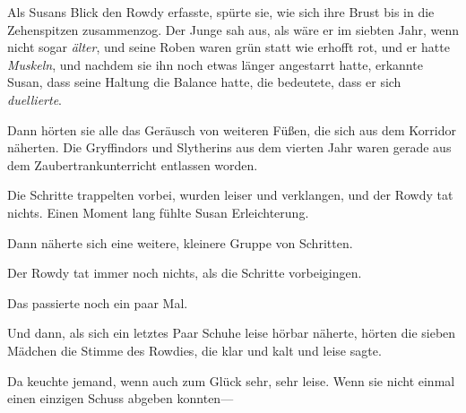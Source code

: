 Als Susans Blick den Rowdy erfasste, spürte sie, wie sich ihre Brust bis in die Zehenspitzen zusammenzog. Der Junge sah aus, als wäre er im siebten Jahr, wenn nicht sogar \emph{älter}, und seine Roben waren grün statt wie erhofft rot, und er hatte \emph{Muskeln}, und nachdem sie ihn noch etwas länger angestarrt hatte, erkannte Susan, dass seine Haltung die Balance hatte, die bedeutete, dass er sich \emph{duellierte}.

Dann hörten sie alle das Geräusch von weiteren Füßen, die sich aus dem Korridor näherten. Die Gryffindors und Slytherins aus dem vierten Jahr waren gerade aus dem Zaubertrankunterricht entlassen worden.

Die Schritte trappelten vorbei, wurden leiser und verklangen, und der Rowdy tat nichts. Einen Moment lang fühlte Susan Erleichterung.

Dann näherte sich eine weitere, kleinere Gruppe von Schritten.

Der Rowdy tat immer noch nichts, als die Schritte vorbeigingen.

Das passierte noch ein paar Mal.

Und dann, als sich ein letztes Paar Schuhe leise hörbar näherte, hörten die sieben Mädchen die Stimme des Rowdies, die klar und kalt und leise  sagte.

Da keuchte jemand, wenn auch zum Glück sehr, sehr leise. Wenn sie nicht einmal einen einzigen Schuss abgeben konnten—

